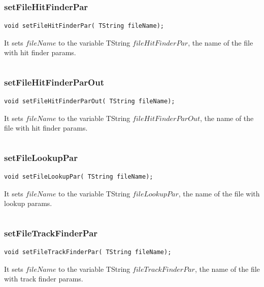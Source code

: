 \documentclass[a4paper]{book}
\begin{document}
\[\]

\subsubsection{setFileHitFinderPar}

\begin{lstlisting}[style=customc]
void setFileHitFinderPar( TString fileName);
\end{lstlisting}

It sets $fileName$ to the variable TString $fileHitFinderPar$, the name of the file with hit finder params.

\[\]

\subsubsection{setFileHitFinderParOut}

\begin{lstlisting}[style=customc]
void setFileHitFinderParOut( TString fileName);
\end{lstlisting}

It sets $fileName$ to the variable TString $fileHitFinderParOut$, the name of the file with hit finder params.

\[\]

\subsubsection{setFileLookupPar}

\begin{lstlisting}[style=customc]
void setFileLookupPar( TString fileName);
\end{lstlisting}

It sets $fileName$ to the variable TString $fileLookupPar$, the name of the file with lookup params.

\[\]

\subsubsection{setFileTrackFinderPar}

\begin{lstlisting}[style=customc]
void setFileTrackFinderPar( TString fileName);
\end{lstlisting}

It sets $fileName$ to the variable TString $fileTrackFinderPar$, the name of the file with track finder params.
\end{document}
